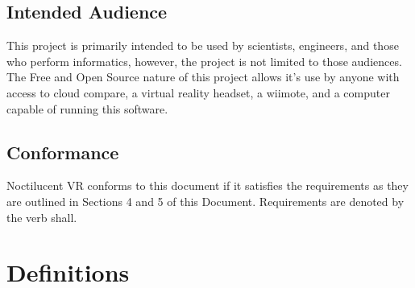 \subsection{Intended Audience}

This project is primarily intended to be used by scientists, engineers, and those who perform informatics, however, the project is not limited to those audiences.
The Free and Open Source nature of this project allows it's use by anyone with access to cloud compare, a virtual reality headset, a wiimote, and a computer capable of running this software.

\subsection{Conformance}

Noctilucent VR conforms to this document if it satisfies the requirements as they are outlined in Sections 4 and 5 of this Document. Requirements are denoted by the verb shall.

\section{Definitions}

